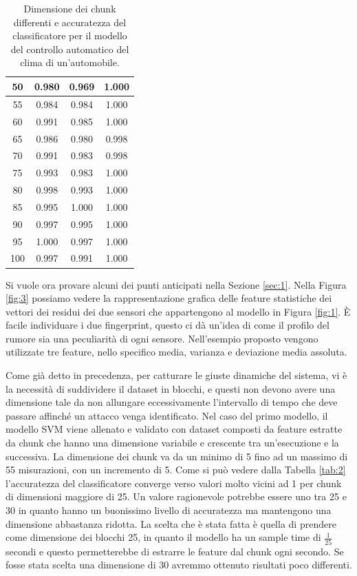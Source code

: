 \documentclass[Lau,binding=0.6cm]{sapthesis}
\begin{document}
\begin{table}[htb]
\begin{center}
\begin{tabular}{|c|c|c|c|}
        \hline
        50 & 0.980 & 0.969 & 1.000 \\
        \hline
        55 & 0.984 & 0.984 & 1.000 \\
        \hline
        60 & 0.991 & 0.985 & 1.000 \\
        \hline
        65 & 0.986 & 0.980 & 0.998 \\
        \hline
        70 & 0.991 & 0.983 & 0.998 \\
        \hline
        75 & 0.993 & 0.983 & 1.000 \\
        \hline
        80 & 0.998 & 0.993 & 1.000 \\
        \hline
        85 & 0.995 & 1.000 & 1.000 \\
        \hline
        90 & 0.997 & 0.995 & 1.000 \\
        \hline
        95 & 1.000 & 0.997 & 1.000 \\
        \hline
        100 & 0.997 & 0.991 & 1.000 \\
        \hline
    \end{tabular}
    \end{center}
    \caption{Dimensione dei chunk differenti e accuratezza del classificatore per il modello del controllo automatico del clima di un'automobile.}
    \label{tab:3}
\end{table}

Si vuole ora provare alcuni dei punti anticipati nella Sezione \ref{sec:1}.
Nella Figura \ref{fig:3} possiamo vedere la rappresentazione grafica delle feature statistiche dei vettori dei residui dei due sensori che appartengono al modello in Figura \ref{fig:1}.
\`E facile individuare i due fingerprint, questo ci d\`a un'idea di come il profilo del rumore sia una peculiarit\`a di ogni sensore. Nell'esempio proposto vengono utilizzate tre feature, nello specifico media, varianza e deviazione media assoluta.

Come gi\`a detto in precedenza, per catturare le giuste dinamiche del sistema, vi \`e la necessit\`a di suddividere il dataset in blocchi, e questi non devono avere una dimensione tale da non allungare eccessivamente l'intervallo di tempo che deve passare affinch\'e un attacco venga identificato.
Nel caso del primo modello, il modello SVM viene allenato e validato con dataset composti da feature estratte da chunk che hanno una dimensione variabile e crescente tra un'esecuzione e la successiva. La dimensione dei chunk va da un minimo di 5 fino ad un massimo di 55 misurazioni, con un incremento di 5.
Come si pu\`o vedere dalla Tabella \ref{tab:2} l'accuratezza del classificatore converge verso valori molto vicini ad 1 per chunk di dimensioni maggiore di 25.
Un valore ragionevole potrebbe essere uno tra 25 e 30 in quanto hanno un buonissimo livello di accuratezza ma mantengono una dimensione abbastanza ridotta.
La scelta che \`e stata fatta \`e quella di prendere come dimensione dei blocchi 25, in quanto il modello ha un sample time di $\frac{1}{25}$ secondi e questo permetterebbe di estrarre le feature dal chunk ogni secondo.
Se fosse stata scelta una dimensione di 30 avremmo ottenuto risultati poco differenti.
\end{document}

